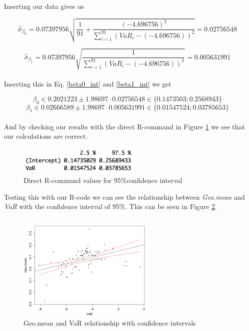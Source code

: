 \documentclass{article}
\begin{document}
Inserting our data gives us 

\begin{equation}
\hat{\sigma}_{\beta_0}=
                0.07397956\sqrt{\frac{1}{91} + 
                \frac{(-4.696756)^2}{\sum_{i=1}^{91} (VaR_i-(-4.696756))^2}}
                =0.02756548
\end{equation}

\begin{equation}
\hat{\sigma}_{\beta_1}=
                0.07397956\sqrt{
                \frac{1}{\sum_{i=1}^{91} (VaR_i-(-4.696756))^2}}
                =0.005631991
\end{equation}
\\

Inserting this in Eq. \ref{beta0_int} and \ref{beta1_int} we get

\begin{equation}\label{beta0_int}
\beta_0 \in 0.2021223 \pm 1.98697 \cdot 0.02756548
        \in \{ 0.1473503 ; 0.2568943\}
\end{equation}
\begin{equation}\label{beta1_int}
\beta_1 \in 0.02666589 \pm 1.98697 \cdot 0.005631991
        \in \{0.01547524; 0.03785653 \}
\end{equation}
\vspace{2mm}
\\

And by checking our results with the direct R-command in Figure \ref{fig:Rcode_int} we see that our calculations are correct.

\begin{figure}[h!]
\centering
\includegraphics[width=6cm]{fig/Rcode_int.png}
\caption{Direct R-command values for 95\%confidence interval}
\label{fig:Rcode_int}
\end{figure}

Testing this with our R-code we can see the relationship between \textit{Geo.mean} and \textit{VaR} with the confidence interval of 95\%. This can be seen in Figure \ref{fig:CInt}.

\begin{figure}[h!]
\centering
\includegraphics[width=0.6\textwidth]{fig/CInt.png}
\caption{Geo.mean and VaR relationship with confidence intervals }
\label{fig:CInt}
\end{figure}
\end{document}
